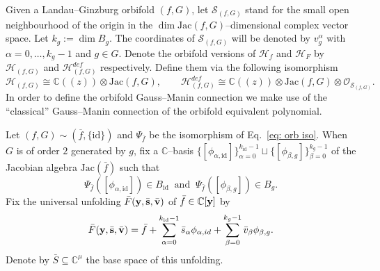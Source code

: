 \documentclass[reqno,12pt]{amsart}
\numberwithin{equation}{section}
\theoremstyle{plain}
\theoremstyle{definition}
\newcommand{\CC}{{\mathbb{C}}}
\newcommand{\Jac}{\mathrm{Jac}}
\newcommand{\id}{\mathrm{id}}
\newcommand{\by}{{\bf y}}
\def\H{{\mathcal H}}
\def\O{{\mathcal O}}
\numberwithin{equation}{section}
\begin{document}
Given a Landau--Ginzburg orbifold $(f,G)$, let $\mathcal{S}_{(f,G)}$ stand for the small open neighbourhood of the origin in the $\dim \Jac(f,G)$--dimensional complex vector space. Let $k_g := \dim B_g$. The coordinates of $\mathcal{S}_{(f,G)}$ will be denoted by $v_{g}^{\alpha}$ with ${\alpha = 0,\dots,k_g -1}$ and $g \in G$.
Denote the orbifold versions of $\H_f$ and $\H_F$ by $\H_{(f,G)}$ and $\H^{def}_{(f,G)}$ respectively. Define them via the following isomorphism
\[
    \H_{(f,G)} \cong \CC((z)) \otimes \Jac(f,G), \qquad \H^{def}_{(f,G)} \cong \CC((z)) \otimes \Jac(f,G) \otimes \O_{\mathcal{S}_{(f,G)}}.
\]
In order to define the orbifold Gauss--Manin connection we make use of the ``classical'' Gauss--Manin connection of the orbifold equivalent polynomial.

Let $(f,G) \sim (\overline{f},\{\id\})$ and $\Psi_{\bar f}$ be the isomorphism of Eq.~\eqref{eq: orb iso}.
When $G$ is of order $2$ generated by $g$, fix a $\CC$--basis $\lbrace [\phi_{\alpha, \id}]\rbrace_{\alpha=0}^{k_\id-1} \sqcup \lbrace [\phi_{\beta, g}] \rbrace_{\beta=0}^{k_g-1}$ of the Jacobian algebra $\Jac(\bar{f})$ 
such that 
\begin{equation}\label{eq: g-sector generators}
        \Psi_{\bar{f}}([\phi_{\alpha, \id}]) \in B_{\id} \ \text{ and } \ \Psi_{\bar{f}}([\phi_{\beta, g}]) \in B_{g}.
\end{equation}
Fix the universal unfolding $\bar{F}(\by, \bar{\textbf{s}}, \bar{\textbf{v}})$ of $\bar{f} \in \CC[\by]$ by
\[
    \bar{F}(\by, \bar{\textbf{s}}, \bar{\textbf{v}}) = \bar{f} + \sum_{\alpha=0}^{k_\id-1} \bar{s}_\alpha\phi_{\alpha, id} + \sum_{\beta=0}^{k_g-1} \bar{v}_\beta\phi_{\beta,g}.
\]
Denote by $\bar{S} \subseteq \CC^{\mu}$ the base space of this unfolding. 
\end{document}
